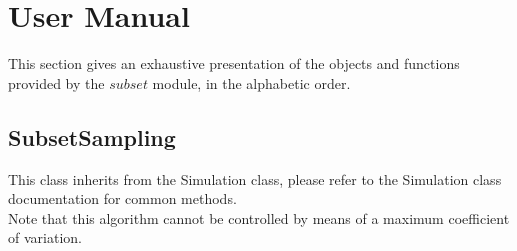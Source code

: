 % 

\section{User Manual}

This section gives an exhaustive presentation of the objects and functions provided by the $subset$ module, in the alphabetic order.

\subsection{SubsetSampling}

This class inherits from the Simulation class, please refer to the Simulation class documentation for common methods.\\
Note that this algorithm cannot be controlled by means of a maximum coefficient of variation.\\


